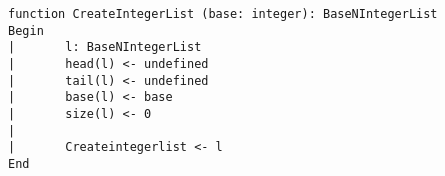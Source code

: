\begin{lstlisting}[breaklines]
function CreateIntegerList (base: integer): BaseNIntegerList
Begin
|       l: BaseNIntegerList
|       head(l) <- undefined
|       tail(l) <- undefined
|       base(l) <- base
|       size(l) <- 0
|
|       Createintegerlist <- l
End
\end{lstlisting}
